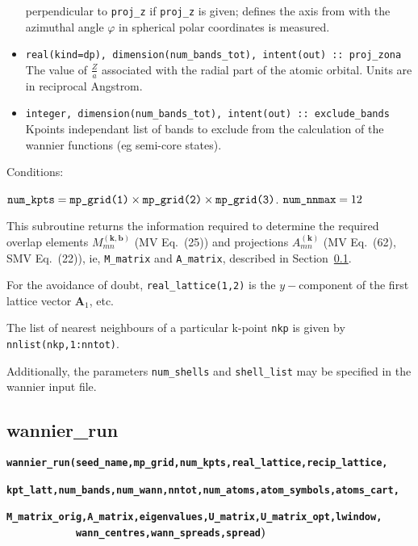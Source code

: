 \begin{itemize}
perpendicular to \verb#proj_z# if \verb#proj_z# is given; defines the
axis from with the azimuthal angle $\varphi$ in spherical polar
coordinates is measured.
\item \verb#real(kind=dp), dimension(num_bands_tot), intent(out) :: proj_zona#\\
The value of $\frac{Z}{a}$ associated
with the radial part of the atomic orbital. Units are in reciprocal
Angstrom.
\item \verb#integer, dimension(num_bands_tot), intent(out) :: exclude_bands#\\ 
      Kpoints independant list of bands to exclude from the calculation of the wannier functions 
(eg semi-core states).

\end{itemize}

Conditions:
\begin{itemize}
\cond $\verb#num_kpts# = \verb#mp_grid(1)# \times \verb#mp_grid(2)#
\times \verb#mp_grid(3)#$.
\cond $\verb#num_nnmax# = 12$
\end{itemize}

This subroutine returns the information required to determine the
required overlap elements $M_{mn}^{(\mathbf{k,b})}$ (MV Eq.~(25)) and
projections $A_{mn}^{(\mathbf{k})}$ (MV Eq.~(62), SMV Eq.~(22)),
ie, \verb#M_matrix# and \verb#A_matrix#, described in
Section~\ref{wannier_run}.

For the avoidance of doubt, \verb#real_lattice(1,2)# is the
$y-$component of the first lattice vector $\mathbf{A}_{1}$, etc.

The list of nearest neighbours of a particular k-point \verb#nkp# is
given by \verb#nnlist(nkp,1:nntot)#.

Additionally, the parameters \verb#num_shells# and \verb#shell_list#
may be specified in the wannier input file.

\subsection{wannier\_run} \label{wannier_run}

{\noindent \bf \verb#wannier_run(seed_name,mp_grid,num_kpts,real_lattice,recip_lattice,#\\
\verb#            kpt_latt,num_bands,num_wann,nntot,num_atoms,atom_symbols,atoms_cart,#\\
\verb#            M_matrix_orig,A_matrix,eigenvalues,U_matrix,U_matrix_opt,lwindow,#\\
\verb#            wann_centres,wann_spreads,spread#)}

